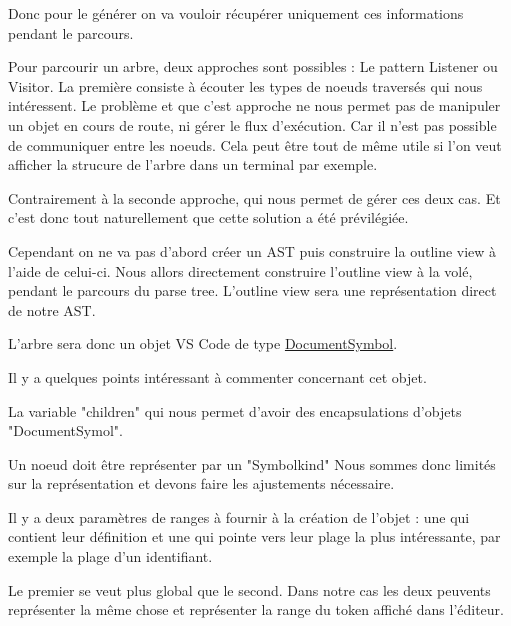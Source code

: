 \documentclass[
    iict, %
    il, %
]{heig-tb}
\begin{document}
Donc pour le générer on va vouloir récupérer uniquement ces informations pendant le parcours.

Pour parcourir un arbre, deux approches sont possibles : Le pattern Listener ou Visitor.
La première consiste à écouter les types de noeuds traversés qui nous intéressent. Le problème et que c'est approche ne nous permet pas de manipuler un objet en cours de route, ni gérer le flux d'exécution.
Car il n'est pas possible de communiquer entre les noeuds. Cela peut être tout de même utile si l'on veut afficher la strucure de l'arbre dans un terminal par exemple.

Contrairement à la seconde approche, qui nous permet de gérer ces deux cas. Et c'est donc tout naturellement que cette solution a été prévilégiée.

Cependant on ne va pas d'abord créer un AST puis construire la outline view à l'aide de celui-ci.
Nous allors directement construire l'outline view à la volé, pendant le parcours du parse tree. L'outline view sera une représentation direct de notre AST.

L'arbre sera donc un objet VS Code de type \href{https://code.visualstudio.com/api/references/vscode-api#DocumentSymbol}{DocumentSymbol}.

Il y a quelques points intéressant à commenter concernant cet objet.

La variable "children" qui nous permet d'avoir des encapsulations d'objets "DocumentSymol".

Un noeud doit être représenter par un "Symbolkind" %
Nous sommes donc limités sur la représentation et devons faire les ajustements nécessaire.

Il y a deux paramètres de ranges à fournir à la création de l'objet : une qui contient leur définition et une qui pointe vers leur plage la plus intéressante, par exemple la plage d'un identifiant.

Le premier se veut plus global que le second.
Dans notre cas les deux peuvents représenter la même chose et représenter la range du token affiché dans l'éditeur.

\end{document}
